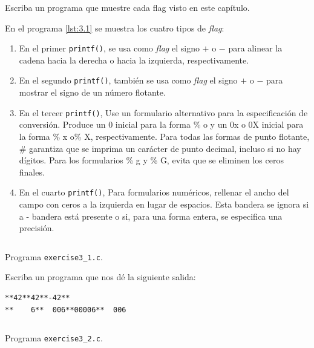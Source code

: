 \documentclass[spanish,addpoints,answers,a4paper]{exam}
\begin{document}
\begin{questions}

\question Escriba un programa que muestre cada flag visto en este capítulo.

\begin{solution}
En el programa \ref{lst:3.1} se muestra los cuatro tipos de \textit{flag}:

\begin{enumerate}
	\item En el primer \texttt{printf()}, se usa como \textit{flag} el signo $+$ o $-$ para alinear la cadena hacia la derecha o hacia la izquierda, respectivamente.
	
	\item En el segundo \texttt{printf()}, también se usa como \textit{flag} el signo $+$ o $-$ para mostrar el signo de un número flotante.%
	
	\item En el tercer \texttt{printf()}, Use un formulario alternativo para la especificación de conversión. Produce un 0 inicial para la forma \% o y un 0x o 0X inicial para la forma \% x o\% X, respectivamente. Para todas las formas de punto flotante, \# garantiza que se imprima un carácter de punto decimal, incluso si no hay dígitos. Para los formularios \% g y \% G, evita que se eliminen los ceros finales.
	
	\item En el cuarto \texttt{printf()}, Para formularios numéricos, rellenar el ancho del campo con ceros a la izquierda en lugar de espacios. Esta bandera se ignora si a - bandera está presente o si, para una forma entera, se especifica una precisión.
\end{enumerate}

\begin{listing}[H]
	\footnotesize
	\inputminted{c}{exercise3_1.c}
	\caption{Programa \texttt{exercise3\_1.c}.}
	\label{lst:3.1}
\end{listing}
\end{solution}

\question Escriba un programa que nos dé la siguiente salida:

\begin{verbatim}
**42**42**-42**
**    6**  006**00006**  006
\end{verbatim}

\begin{solution}
\begin{listing}[H]
	\footnotesize
	\inputminted{c}{exercise3_2.c}
	\caption{Programa \texttt{exercise3\_2.c}.}
	\label{lst:3.2}
\end{listing}
\end{solution}


\end{questions}
\end{document}
